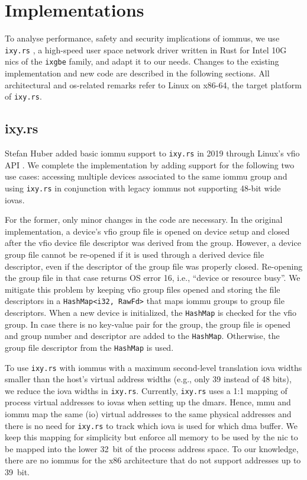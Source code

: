 \chapter{Implementations}
\label{chap:implementations}

To analyse performance, safety and security implications of \acp{iommu}, we use
\texttt{ixy.rs} \cite{ellmann2018writing}, a high-speed user space network
driver written in Rust for Intel 10G \acp{nic} of the \texttt{ixgbe} family, and
adapt it to our needs. Changes to the existing implementation and new code are
described in the following sections. All architectural and \ac{os}-related
remarks refer to Linux on x86-64, the target platform of \texttt{ixy.rs}.


\section{ixy.rs}
\label{sec:ixy_rs}

Stefan Huber added basic \ac{iommu} support to \texttt{ixy.rs} in 2019 through
Linux's \ac{vfio} API \cite{huber2019using}. We complete the implementation by
adding support for the following two use cases: accessing multiple devices
associated to the same \ac{iommu} group and using \texttt{ixy.rs} in conjunction
with legacy \acp{iommu} not supporting 48-bit wide \acp{iova}.

For the former, only minor changes in the code are necessary. In the original
implementation, a device's \ac{vfio} group file is opened on device setup and
closed after the \ac{vfio} device file descriptor was derived from the group.
However, a device group file cannot be re-opened if it is used through a derived
device file descriptor, even if the descriptor of the group file was properly
closed. Re-opening the group file in that case returns OS error 16, i.e.,
``device or resource busy''. We mitigate this problem by keeping \ac{vfio} group
files opened and storing the file descriptors in a \texttt{HashMap<i32, RawFd>}
that maps \ac{iommu} groups to group file descriptors. When a new device is
initialized, the \texttt{HashMap} is checked for the \ac{vfio} group. In case
there is no key-value pair for the group, the group file is opened and group
number and descriptor are added to the \texttt{HashMap}. Otherwise, the group
file descriptor from the \texttt{HashMap} is used.

To use \texttt{ixy.rs} with \acp{iommu} with a maximum second-level translation
\ac{iova} widths smaller than the host's virtual address widths (e.g., only 39
instead of 48 bits), we reduce the \ac{iova} widths in \texttt{ixy.rs}.
Currently, \texttt{ixy.rs} uses a 1:1 mapping of process virtual addresses to
\acp{iova} when setting up the \acp{dmar}. Hence, \ac{mmu} and \ac{iommu} map
the same (\ac{io}) virtual addresses to the same physical addresses and there is
no need for \texttt{ixy.rs} to track which \ac{iova} is used for which \ac{dma}
buffer. We keep this mapping for simplicity but enforce all memory to be used by
the \ac{nic} to be mapped into the lower 32~bit of the process address space.
To our knowledge, there are no \acp{iommu} for the x86 architecture that do not
support addresses up to 39~bit.

